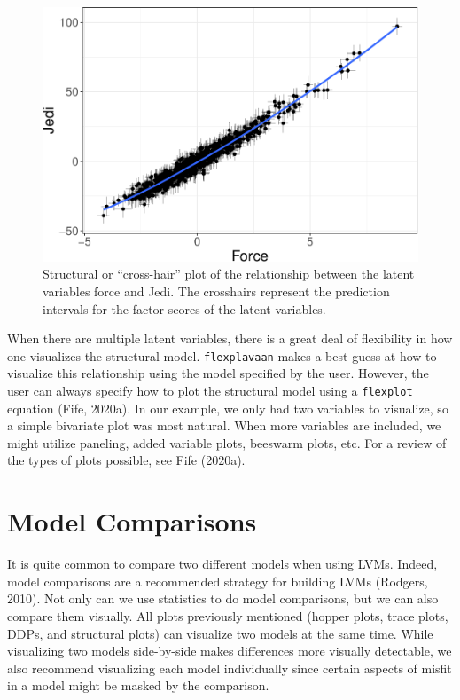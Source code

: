 \documentclass[
  english,
  doc]{apa6}
\begin{document}
\begin{figure}
\centering
\includegraphics{flexplavaan_draft_files/figure-latex/beech-1.pdf}
\caption{\label{fig:beech}Structural or ``cross-hair'' plot of the relationship between the latent variables force and Jedi. The crosshairs represent the prediction intervals for the factor scores of the latent variables.}
\end{figure}

When there are multiple latent variables, there is a great deal of flexibility in how one visualizes the structural model. \texttt{flexplavaan} makes a best guess at how to visualize this relationship using the model specified by the user. However, the user can always specify how to plot the structural model using a \texttt{flexplot} equation (Fife, 2020a). In our example, we only had two variables to visualize, so a simple bivariate plot was most natural. When more variables are included, we might utilize paneling, added variable plots, beeswarm plots, etc. For a review of the types of plots possible, see Fife (2020a).

\hypertarget{model-comparisons}{%
\section{Model Comparisons}\label{model-comparisons}}

It is quite common to compare two different models when using LVMs. Indeed, model comparisons are a recommended strategy for building LVMs (Rodgers, 2010). Not only can we use statistics to do model comparisons, but we can also compare them visually. All plots previously mentioned (hopper plots, trace plots, DDPs, and structural plots) can visualize two models at the same time. While visualizing two models side-by-side makes differences more visually detectable, we also recommend visualizing each model individually since certain aspects of misfit in a model might be masked by the comparison.
\end{document}
